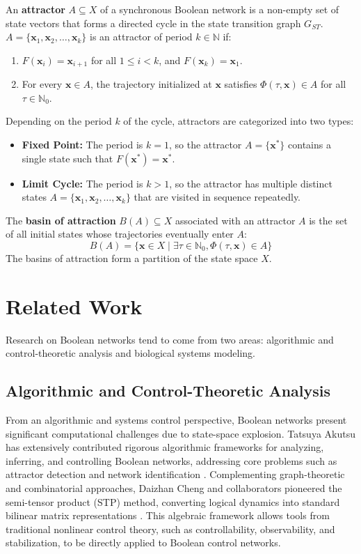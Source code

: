 \documentclass[sigconf]{acmart}
\begin{document}
An \textbf{attractor} $A \subseteq X$ of a synchronous Boolean network is a non-empty set of state vectors that forms a directed cycle in the state transition graph $G_{ST}$. $A = \{\mathbf{x}_1, \mathbf{x}_2, \dots, \mathbf{x}_k\}$ is an attractor of period $k \in \mathbb{N}$ if:
\begin{enumerate}
    \item $F(\mathbf{x}_i) = \mathbf{x}_{i + 1}$ for all $1 \leq i < k$, and $F(\mathbf{x}_k) = \mathbf{x}_1$.
    \item For every $\mathbf{x} \in A$, the trajectory initialized at $\mathbf{x}$ satisfies $\Phi(\tau, \mathbf{x}) \in A$ for all $\tau \in \mathbb{N}_0$.
\end{enumerate}

Depending on the period $k$ of the cycle, attractors are categorized into two types:
\begin{itemize}
    \item \textbf{Fixed Point:} The period is $k = 1$, so the attractor $A = \{\mathbf{x}^*\}$ contains a single state such that $F(\mathbf{x}^*) = \mathbf{x}^*$.
    \item \textbf{Limit Cycle:} The period is $k > 1$, so the attractor has multiple distinct states $A = \{\mathbf{x}_1, \mathbf{x}_2, \dots, \mathbf{x}_k\}$ that are visited in sequence repeatedly.
\end{itemize}

The \textbf{basin of attraction} $B(A) \subseteq X$ associated with an attractor $A$ is the set of all initial states whose trajectories eventually enter $A$:
$$
B(A) = \{\mathbf{x} \in X \mid \exists \tau \in \mathbb{N}_0, \Phi(\tau, \mathbf{x}) \in A\}
$$
The basins of attraction form a partition of the state space $X$.

\section{Related Work}
Research on Boolean networks tend to come from two areas: algorithmic and control-theoretic analysis and biological systems modeling.

\subsection*{Algorithmic and Control-Theoretic Analysis}
From an algorithmic and systems control perspective, Boolean networks present significant computational challenges due to state-space explosion. Tatsuya Akutsu has extensively contributed rigorous algorithmic frameworks for analyzing, inferring, and controlling Boolean networks, addressing core problems such as attractor detection and network identification \cite{Akutsu2018}. Complementing graph-theoretic and combinatorial approaches, Daizhan Cheng and collaborators pioneered the semi-tensor product (STP) method, converting logical dynamics into standard bilinear matrix representations \cite{Cheng2010}. This algebraic framework allows tools from traditional nonlinear control theory, such as controllability, observability, and stabilization, to be directly applied to Boolean control networks.
\end{document}
